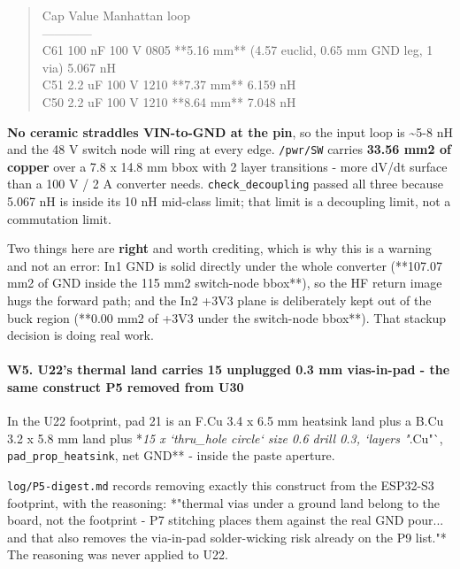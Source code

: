 \documentclass[11pt,a4paper]{article}
\begin{document}
\begin{quote}\small\ttfamily\raggedright
\textbar{} Cap \textbar{} Value \textbar{} Manhattan \textbar{} loop \textbar{}\\
\textbar{}---\textbar{}---\textbar{}---\textbar{}---\textbar{}\\
\textbar{} C61 \textbar{} 100 nF 100 V 0805 \textbar{} {*}{*}5.16 mm{*}{*} (4.57 euclid, 0.65 mm GND leg, 1 via) \textbar{} 5.067 nH \textbar{}\\
\textbar{} C51 \textbar{} 2.2 uF 100 V 1210 \textbar{} {*}{*}7.37 mm{*}{*} \textbar{} 6.159 nH \textbar{}\\
\textbar{} C50 \textbar{} 2.2 uF 100 V 1210 \textbar{} {*}{*}8.64 mm{*}{*} \textbar{} 7.048 nH \textbar{}
\end{quote}
\textbf{No ceramic straddles VIN-to-GND at the pin}, so the input loop is \textasciitilde{}5-8 nH and the 48 V switch node will ring at every edge. \texttt{/pwr/SW} carries \textbf{33.56 mm2 of copper} over a 7.8 x 14.8 mm bbox with 2 layer transitions - more dV/dt surface than a 100 V / 2 A converter needs. \texttt{check\_decoupling} passed all three because 5.067 nH is inside its 10 nH mid-class limit; that limit is a decoupling limit, not a commutation limit.

Two things here are \textbf{right} and worth crediting, which is why this is a warning and not an error: In1 GND is solid directly under the whole converter ({*}{*}107.07 mm2 of GND inside the 115 mm2 switch-node bbox{*}{*}), so the HF return image hugs the forward path; and the In2 +3V3 plane is deliberately kept out of the buck region ({*}{*}0.00 mm2 of +3V3 under the switch-node bbox{*}{*}). That stackup decision is doing real work.

\paragraph*{W5. U22's thermal land carries 15 unplugged 0.3 mm vias-in-pad - the same construct P5 removed from U30}
In the U22 footprint, pad 21 is an F.Cu 3.4 x 6.5 mm heatsink land plus a B.Cu 3.2 x 5.8 mm land plus {*}\emph{15 x `thru\_hole circle` size 0.6 drill 0.3, `layers "}.Cu"`, \texttt{pad\_prop\_heatsink}, net GND{*}{*} - inside the paste aperture.

\texttt{log/P5-digest.md} records removing exactly this construct from the ESP32-S3 footprint, with the reasoning: {*}"thermal vias under a ground land belong to the board, not the footprint - P7 stitching places them against the real GND pour... and that also removes the via-in-pad solder-wicking risk already on the P9 list."{*} The reasoning was never applied to U22.
\end{document}
